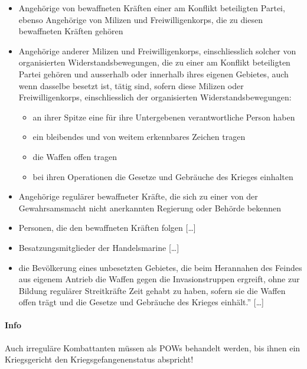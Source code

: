{}\documentclass[a4paper]{article}
\providecommand{\tightlist}{\setlength{\itemsep}{1mm}\setlength{\parskip}{1mm}}
\begin{document}
\begin{itemize}
	\tightlist
	\item
	      Angehörige von bewaffneten Kräften einer am Konflikt beteiligten
	      Partei, ebenso Angehörige von Milizen und Freiwilligenkorps, die zu
	      diesen bewaffneten Kräften gehören
	\item
	      Angehörige anderer Milizen und Freiwilligenkorps, einschliesslich
	      solcher von organisierten Widerstandsbewegungen, die zu einer am
	      Konflikt beteiligten Partei gehören und ausserhalb oder innerhalb
	      ihres eigenen Gebietes, auch wenn dasselbe besetzt ist, tätig sind,
	      sofern diese Milizen oder Freiwilligenkorps, einschliesslich der
	      organisierten Widerstandsbewegungen:

	      \begin{itemize}
		      \tightlist
		      \item
		            an ihrer Spitze eine für ihre Untergebenen verantwortliche Person
		            haben
		      \item
		            ein bleibendes und von weitem erkennbares Zeichen tragen
		      \item
		            die Waffen offen tragen
		      \item
		            bei ihren Operationen die Gesetze und Gebräuche des Krieges
		            einhalten
	      \end{itemize}
	\item
	      Angehörige regulärer bewaffneter Kräfte, die sich zu einer von der
	      Gewahrsamsmacht nicht anerkannten Regierung oder Behörde bekennen
	\item
	      Personen, die den bewaffneten Kräften folgen {[}\ldots{]}
	\item
	      Besatzungsmitglieder der Handelsmarine {[}\ldots{]}
	\item
	      die Bevölkerung eines unbesetzten Gebietes, die beim Herannahen des
	      Feindes aus eigenem Antrieb die Waffen gegen die Invasionstruppen
	      ergreift, ohne zur Bildung regulärer Streitkräfte Zeit gehabt zu
	      haben, sofern sie die Waffen offen trägt und die Gesetze und Gebräuche
	      des Krieges einhält.'' {[}\ldots{]}
\end{itemize}

\paragraph{Info}\label{info}

Auch irreguläre Kombattanten müssen als POWs behandelt werden, bis ihnen
ein Kriegsgericht den Kriegsgefangenenstatus abspricht!
\end{document}
